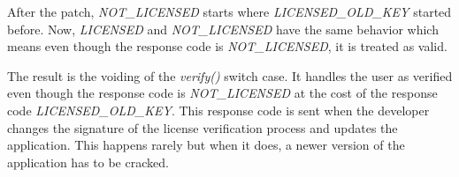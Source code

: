 After the patch, \textit{NOT\_LICENSED} starts where \textit{LICENSED\_OLD\_KEY} started before.
Now, \textit{LICENSED} and \textit{NOT\_LICENSED} have the same behavior which means even though the response code is \textit{NOT\_LICENSED}, it is treated as valid.
\newpage

The result is the voiding of the \textit{verify()} switch case.
It handles the user as verified even though the response code is \textit{NOT\_LICENSED} at the cost of the response code \textit{LICENSED\_OLD\_KEY}.
This response code is sent when the developer changes the signature of the license verification process and updates the application.
This happens rarely but when it does, a newer version of the application has to be cracked.

